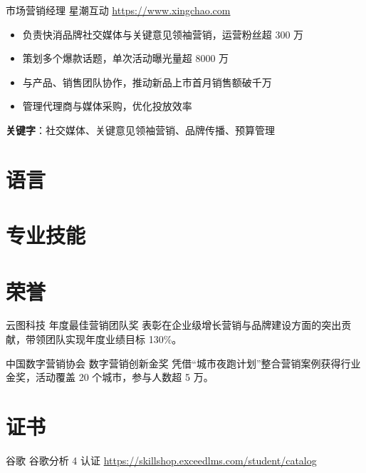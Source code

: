 \documentclass[a4paper, serif, 10pt]{moderncv}
\begin{document}
        {市场营销经理}
        {星潮互动}
        {\url{https://www.xingchao.com}}
        {}
        {\begin{itemize}
\item 负责快消品牌社交媒体与关键意见领袖营销，运营粉丝超 300 万
\item 策划多个爆款话题，单次活动曝光量超 8000 万
\item 与产品、销售团队协作，推动新品上市首月销售额破千万
\item 管理代理商与媒体采购，优化投放效率
\end{itemize}
\textbf{关键字}：社交媒体、关键意见领袖营销、品牌传播、预算管理}
\section{语言}

\section{专业技能}

\section{荣誉}

        {云图科技}
        {年度最佳营销团队奖}
        {}
        {}
        {表彰在企业级增长营销与品牌建设方面的突出贡献，带领团队实现年度业绩目标 130\%。}

        {中国数字营销协会}
        {数字营销创新金奖}
        {}
        {}
        {凭借“城市夜跑计划”整合营销案例获得行业金奖，活动覆盖 20 个城市，参与人数超 5 万。}
\section{证书}

        {谷歌}
        {谷歌分析 4 认证}
        {\url{https://skillshop.exceedlms.com/student/catalog}}
        {}
        {}
\end{document}

